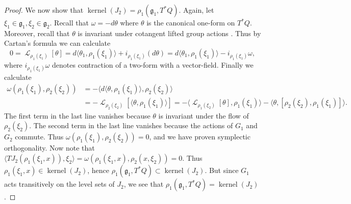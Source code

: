 \documentclass[12pt]{amsart}
\DeclareMathOperator{\kernel}{kernel}
\DeclareMathOperator{\lie}{\mathcal{L}}
\begin{document}
\begin{proof}
    We now show that $\kernel(J_2) = \rho_1(\mathfrak{g}_1,T^*Q)$.
    Again, let $\xi_1 \in \mathfrak{g}_1, \xi_2 \in \mathfrak{g}_2$.
    Recall that $\omega = - d \theta$ where $\theta$ is the canonical one-form on $T^*Q$.
    Moreover, recall that $\theta$ is invariant under cotangent lifted group actions \cite[Theorem 3.2.12]{FOM}.
    Thus by Cartan's formula \cite[Theorem 2.4.13(iv)]{FOM} we can calculate
    \begin{equation*}
      0 = \lie_{\rho_1(\xi_1)} [ \theta] = d \langle \theta_1 , \rho_1(\xi_1) \rangle + i_{\rho_1(\xi_1)}(d\theta) = d \langle \theta_1 , \rho_1(\xi_1) \rangle - i_{\rho_1(\xi_1)} \omega, 
    \end{equation*}
    where $i_{\rho_1(\xi_1)} \omega$ denotes contraction of a two-form with a vector-field.
    Finally we calculate
    \begin{align*}
    	\omega( \rho_1(\xi_1) , \rho_2(\xi_2) ) &=  -\langle d \langle \theta, \rho_1(\xi_1) \rangle ,  \rho_2(\xi_2) \rangle \\
      &= -\lie_{\rho_2(\xi_2) }[ \langle \theta,\rho_1(\xi_1) \rangle] = - \langle \lie_{\rho_1(\xi_2)}[\theta] , \rho_1(\xi_1) \rangle - \langle \theta , [\rho_2(\xi_2), \rho_1(\xi_1) ] \rangle.
    \end{align*}
    The first term in the last line vanishes because $\theta$ is invariant under the flow of $\rho_2(\xi_2)$.
    The second term in the last line vanishes because the actions of $G_1$ and $G_2$ commute.
    Thus $\omega(\rho_1(\xi_1) , \rho_2(\xi_2) ) = 0$,
    and we have proven symplectic orthogonality.
    Now note that
    $\langle TJ_2 ( \rho_1(\xi_1, x)), \xi_2 \rangle = \omega( \rho_1(\xi_1, x) ,\rho_2(x, \xi_2 )) = 0$.
    Thus $\rho_1(\xi_1 , x) \in \kernel( J_2)$, hence
    $\rho_1(\mathfrak{g}_1 ,T^*Q) \subset \kernel(J_2)$.
    But since $G_1$ acts transitively on the level sets of $J_2$, we see
    that $\rho_1(\mathfrak{g}_1, T^*Q) = \kernel( J_2)$.
  \end{proof}
\end{document}
